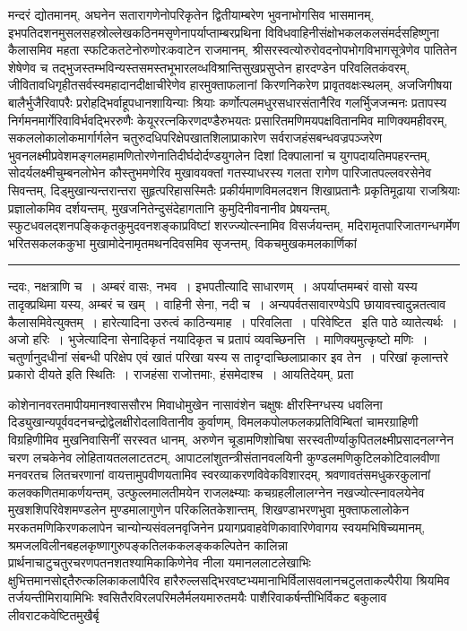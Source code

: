 \documentclass[11pt, openany]{book}
\begin{document}
\newpage

\noindent
मन्दरं द्योतमानम्, अघनेन सतारागणेनोपरिकृतेन द्वितीयाम्बरेण भुवनाभोगसिव भासमानम्, इभपतिदशनमुसलसहस्रोल्लेखकठिनमसृणेनापर्याप्ताम्बरप्रथिना विविधवाहिनीसंक्षोभकलकलसंमर्दसहिष्णुना कैलासमिव महता स्फटिकतटेनोरुणोरःकवाटेन राजमानम्, श्रीसरस्वत्योरुरोवदनोपभोगविभागसूत्रेणेव पातितेन शेषेणेव च तद्भुजस्तम्भविन्यस्तसमस्तभूभारलव्धविश्रान्तिसुखप्रसुप्तेन हारदण्डेन परिवलितकंवरम्, जीवितावधिगृहीतसर्वस्वमहादानदीक्षाचीरेणेव हारमुक्ताफलानां किरणनिकरेण प्रावृतवक्षःस्थलम्, अजजिगीषया बालैर्भुजैरिवापरैः प्ररोहद्भिर्वाहूपधानशायिन्याः श्रियाः कर्णोत्पलमधुरसधारसंतानैरिव गलर्भुिजजन्मनः प्रतापस्य निर्गमनमार्गेरिवाविर्भवद्भिररुणैः केयूररत्नकिरणदण्डैरुभयतः प्रसारितमणिमयपक्षवितानमिव माणिक्यमहीवरम्, सकललोकालोकमार्गार्गलेन चतुरुदधिपरिक्षेपखातशिलाप्राकारेण सर्वराजहंसबन्धवज्रपञ्जरेण भुवनलक्ष्मीप्रवेशमङ्गलमहामणितोरणेनातिदीर्घदोर्दण्डयुगलेन दिशां दिक्पालानां च युगपदायतिमपहरन्तम्, सोदर्यलक्ष्मीचुम्बनलोभेन कौस्तुभमणेरिव मुखावयक्तां गतस्याधरस्य गलता रागेण पारिजातपल्लवरसेनेव सिवन्तम्, दिड्मुखान्यन्तरान्तरा सुहृत्परिहासस्मितैः प्रकीर्यमाणविमलदशन शिखाप्रतानैः प्रकृतिमूढाया राजश्रियाः प्रज्ञालोकमिव दर्शयन्तम्, मुखजनितेन्दुसंदेहागतानि कुमुदिनीवनानीव प्रेषयन्तम्, स्फुटधवलद्शनपङ्किकृतकुमुदवनशङ्काप्रविष्टां शरज्ज्योत्स्नामिव विसर्जयन्तम्, मदिरामृतपारिजातगन्धगर्मेण भरितसकलककुभा मुखामोदेनामृतमथनदिवसमिव सृजन्तम्, विकचमुखकमलकार्णिकां

\vspace{2mm}
\hrule

\noindent
{\s न्दवः, नक्षत्राणि च~। अम्बरं वासः, नभव~। इभपतीत्यादि साधारणम्~। अपर्याप्तमम्बरं वासो यस्य तादृक्प्रथिमा यस्य, अम्बरं च खम्~। वाहिनी सेना, नदी च~। अन्यपर्वतसावारण्येऽपि छायावत्त्वादुन्नतत्वाव कैलासमिवेत्युक्तम्~। हारेत्यादिना उरुत्वं काठिन्यमाह~। परिवलिता~। {\qt परिवेष्टित} \textendash\ इति पाठे व्यातेत्यर्थः~। अजो हरिः~। भुजेत्यादिना सेनादिकृतं नयादिकृत च प्रतापं व्यवच्छिनत्ति~। माणिक्यमुत्कृष्टो मणिः~। चतुर्णानुदधीनां संबन्धी परिक्षेप एवं खातं परिखा यस्य स तादृग्दाच्छिलाप्राकार इव तेन~। परिखां कृलान्तरे प्रकारो दीयते इति स्थितिः~। राजहंसा राजोत्तमाः, हंसमेदाश्च~। आयतिदेयम्, प्रता\textendash}

\newpage

\noindent
कोशेनानवरतमापीयमानश्वाससौरभ मिवाधोमुखेन नासावंशेन चक्षुषः क्षीरस्निग्धस्य धवलिना दिड्युखान्यपूर्ववदनचन्द्रोद्वेलक्षीरोदलावितानीव कुर्वाणम्, विमलकपोलफलकप्रतिविम्बितां चामरग्राहिणी विग्रहिणीमिव मुखनिवासिनीं सरस्वत धानम्, अरुणेन चूडामणिशोचिषा सरस्वतीर्ण्याकुपितलक्ष्मीप्रसादनलग्नेन चरण लचकेनेव लोहितायतललाटतटम्, आपाटलांशुतन्त्रीसंतानवलयिनी कुण्डलमणिकुटिलकोटिवालवीणा मनवरतच लितचरणानां वायत्तामुपवीणयतामिव स्वरव्याकरणविवेकविशारदम्, श्रवणावतंसमधुकरकुलानां कलक्कणितमाकर्णयन्तम्, उत्फुल्लमालतीमयेन राजलक्ष्म्याः कचग्रहलीलालग्नेन नखज्योत्स्नावलयेनेव मुखशशिपरिवेशमण्डलेन मुण्डमालागुणेन परिकलितकेशान्तम्, शिखण्डाभरणभुवा मुक्ताफलालोकेन मरकतमणिकिरणकलापेन चान्योन्यसंवलनवृजिनेन प्रयागप्रवाहवेणिकावारिणेवागय स्वयमभिषिच्यमानम्, श्रमजलविलीनबहलकृष्णागुरुपङ्कतिलककलङ्ककल्पितेन कालिन्ना प्रार्थनाचाटुचतुरचरणपतनशतश्यामिकाकिणेनेव नीला यमानललाटलेखाभिः क्षुभित्तमानसोद्द्तैरुत्कलिकाकलापैरिव हारैरुल्लसद्भिरवष्टभ्यमानाभिर्विलासवलानचटुलताकल्पैरीया श्रियमिव तर्जयन्तीमिरायामिभिः श्वसितैरविरलपरिमलैर्मलयमारुतमयैः पाशैरिवाकर्षन्तीभिर्विकट बकुलाव लीवराटकवेष्टितमुखैर्बृ\textendash
\end{document}
